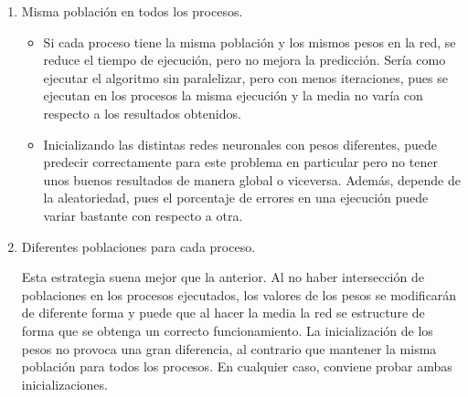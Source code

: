 	\begin{enumerate}
		\item Misma población en todos los procesos. 
		
		\begin{itemize}
			\item Si cada proceso tiene la misma población y los mismos pesos en la red, se reduce el tiempo de ejecución, pero no mejora la predicción. Sería como ejecutar el algoritmo sin paralelizar, pero con menos iteraciones, pues se ejecutan en los procesos la misma ejecución y la media no varía con respecto a los resultados obtenidos.
			\item Inicializando las distintas redes neuronales con pesos diferentes, puede predecir correctamente para este problema en particular pero no tener unos buenos resultados de manera global o viceversa. Además, depende de la aleatoriedad, pues el porcentaje de errores en una ejecución puede variar bastante con respecto a otra. 
		\end{itemize} 
		
		\item Diferentes poblaciones para cada proceso. 
		
		Esta estrategia suena mejor que la anterior. Al no haber intersección de poblaciones en los procesos ejecutados, los valores de los pesos se modificarán de diferente forma y puede que al hacer la media la red se estructure de forma que se obtenga un correcto funcionamiento. La inicialización de los pesos no provoca una gran diferencia, al contrario que mantener la misma población para todos los procesos. En cualquier caso, conviene probar ambas inicializaciones.	
		
		
	\end{enumerate}	
	
	

	